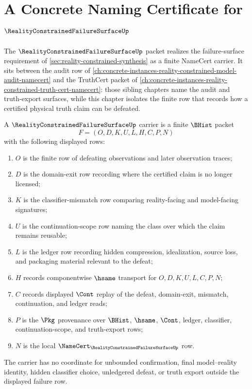 \chapter{A Concrete Naming Certificate for $\RealityConstrainedFailureSurfaceUp$}
\label{ch:concrete-instances-realityconstrainedfailuresurface-namecert}

The $\RealityConstrainedFailureSurfaceUp$ packet realizes the failure-surface requirement of \autoref{sec:reality-constrained-synthesis} as a finite NameCert carrier. It sits between the audit row of \autoref{ch:concrete-instances-reality-constrained-model-audit-namecert} and the TruthCert packet of \autoref{ch:concrete-instances-reality-constrained-truth-cert-namecert}: those sibling chapters name the audit and truth-export surfaces, while this chapter isolates the finite row that records how a certified physical truth claim can be defeated.

\begin{definition}
\label{def:reality-constrained-failure-surface-carrier}
A $\RealityConstrainedFailureSurfaceUp$ carrier is a finite $\BHist$ packet
$$
F=(O,D,K,U,L,H,C,P,N)
$$
with the following displayed rows:
\begin{enumerate}
\item $O$ is the finite row of defeating observations and later observation traces;
\item $D$ is the domain-exit row recording where the certified claim is no longer licensed;
\item $K$ is the classifier-mismatch row comparing reality-facing and model-facing signatures;
\item $U$ is the continuation-scope row naming the class over which the claim remains reusable;
\item $L$ is the ledger row recording hidden compression, idealization, source loss, and packaging material relevant to the defeat;
\item $H$ records componentwise $\hsame$ transport for $O,D,K,U,L,C,P,N$;
\item $C$ records displayed $\Cont$ replay of the defeat, domain-exit, mismatch, continuation, and ledger reads;
\item $P$ is the $\Pkg$ provenance over $\BHist$, $\hsame$, $\Cont$, ledger, classifier, continuation-scope, and truth-export rows;
\item $N$ is the local $\NameCert_{\RealityConstrainedFailureSurfaceUp}$ row.
\end{enumerate}
The carrier has no coordinate for unbounded confirmation, final model--reality identity, hidden classifier choice, unledgered defeat, or truth export outside the displayed failure row.
\end{definition}


